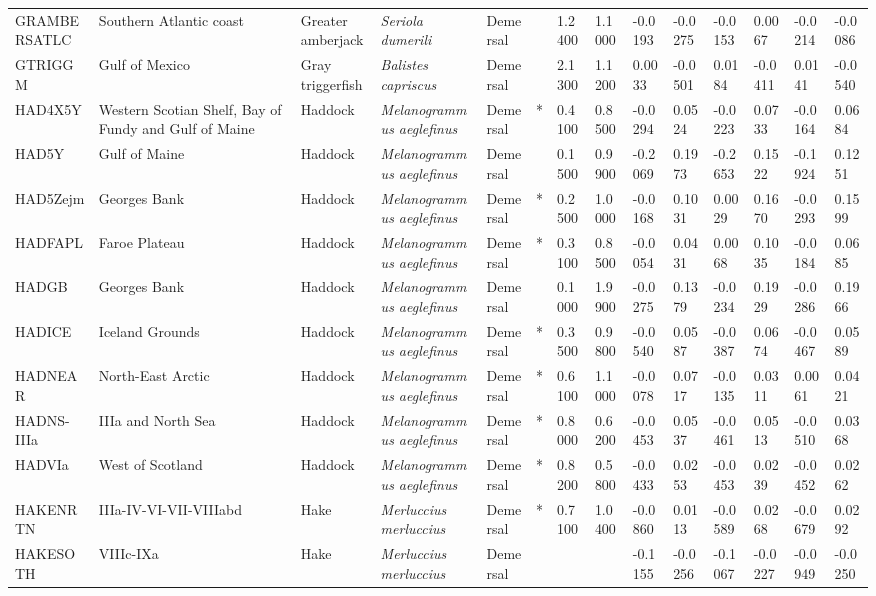 \begin{longtable}{p{2.6cm}p{1.9cm}p{1.7cm}p{1.6cm}p{1cm}p{0.3cm}p{1cm}p{1cm}p{1cm}p{1.1cm}p{1cm}p{1.1cm}p{1cm}p{1.1cm}}
  GRAMBERSATLC & Southern Atlantic coast & Greater amberjack & \textit{Seriola dumerili} & Demersal &   & 1.2400 & 1.1000 & -0.0193 & -0.0275 & -0.0153 & 0.0067 & -0.0214 & -0.0086 \\ 
  GTRIGGM & Gulf of Mexico & Gray triggerfish & \textit{Balistes capriscus} & Demersal &   & 2.1300 & 1.1200 & 0.0033 & -0.0501 & 0.0184 & -0.0411 & 0.0141 & -0.0540 \\ 
  HAD4X5Y & Western Scotian Shelf, Bay of Fundy and Gulf of Maine & Haddock & \textit{Melanogrammus aeglefinus} & Demersal & * & 0.4100 & 0.8500 & -0.0294 & 0.0524 & -0.0223 & 0.0733 & -0.0164 & 0.0684 \\ 
  HAD5Y & Gulf of Maine & Haddock & \textit{Melanogrammus aeglefinus} & Demersal &   & 0.1500 & 0.9900 & -0.2069 & 0.1973 & -0.2653 & 0.1522 & -0.1924 & 0.1251 \\ 
  HAD5Zejm & Georges Bank & Haddock & \textit{Melanogrammus aeglefinus} & Demersal & * & 0.2500 & 1.0000 & -0.0168 & 0.1031 & 0.0029 & 0.1670 & -0.0293 & 0.1599 \\ 
  HADFAPL & Faroe Plateau & Haddock & \textit{Melanogrammus aeglefinus} & Demersal & * & 0.3100 & 0.8500 & -0.0054 & 0.0431 & 0.0068 & 0.1035 & -0.0184 & 0.0685 \\ 
  HADGB & Georges Bank & Haddock & \textit{Melanogrammus aeglefinus} & Demersal &   & 0.1000 & 1.9900 & -0.0275 & 0.1379 & -0.0234 & 0.1929 & -0.0286 & 0.1966 \\ 
  HADICE & Iceland Grounds & Haddock & \textit{Melanogrammus aeglefinus} & Demersal & * & 0.3500 & 0.9800 & -0.0540 & 0.0587 & -0.0387 & 0.0674 & -0.0467 & 0.0589 \\ 
  HADNEAR & North-East Arctic & Haddock & \textit{Melanogrammus aeglefinus} & Demersal & * & 0.6100 & 1.1000 & -0.0078 & 0.0717 & -0.0135 & 0.0311 & 0.0061 & 0.0421 \\ 
  HADNS-IIIa & IIIa and North Sea & Haddock & \textit{Melanogrammus aeglefinus} & Demersal & * & 0.8000 & 0.6200 & -0.0453 & 0.0537 & -0.0461 & 0.0513 & -0.0510 & 0.0368 \\ 
  HADVIa & West of Scotland & Haddock & \textit{Melanogrammus aeglefinus} & Demersal & * & 0.8200 & 0.5800 & -0.0433 & 0.0253 & -0.0453 & 0.0239 & -0.0452 & 0.0262 \\ 
  HAKENRTN & IIIa-IV-VI-VII-VIIIabd & Hake & \textit{Merluccius merluccius} & Demersal & * & 0.7100 & 1.0400 & -0.0860 & 0.0113 & -0.0589 & 0.0268 & -0.0679 & 0.0292 \\ 
  HAKESOTH & VIIIc-IXa & Hake & \textit{Merluccius merluccius} & Demersal &  &  &  & -0.1155 & -0.0256 & -0.1067 & -0.0227 & -0.0949 & -0.0250 \\ 

\end{longtable}
